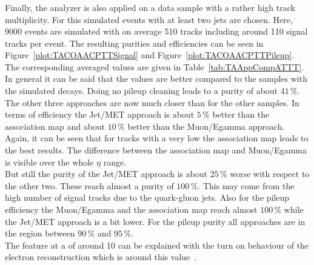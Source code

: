

\subsubsection{\ttbar \label{sec:TASEFRDACPTT}}
Finally, the analyzer is also applied on a data sample with a rather high track multiplicity. For this simulated \ttbar events with at least two jets are chosen. Here, 9000 events are simulated with on average 510 tracks including around 110 signal tracks per event. The resulting purities and efficiencies can be seen in Figure~\ref{plot:TACOAACPTTSignal} and Figure~\ref{plot:TACOAACPTTPileup}. The corresponding averaged values are given in Table~\ref{tab:TAAppCompATTT}. In general it can be said that the values are better compared to the samples with the simulated \Zz decays. Doing no pileup cleaning leads to a purity of about $41\,\%$. The other three approaches are now much closer than for the other samples. In terms of efficiency the Jet/MET approach is about $5\,\%$ better than the association map and about $10\,\%$ better than the Muon/Egamma approach. Again, it can be seen that for tracks with a very low \pt the association map leads to the best results. The difference between the association map and Muon/Egamma is visible over the whole $\eta$ range. \\
But still the purity of the Jet/MET approach is about $25\,\%$ worse with respect to the other two. These reach almost a purity of $100\,\%$. This may come from the high number of signal tracks due to the quark-gluon jets. Also for the pileup efficiency the Muon/Egamma and the association map reach almost $100\,\%$ while the Jet/MET approach is a bit lower. For the pileup purity all approaches are in the region between $90\,\%$ and $95\,\%$. \\
The feature at a \pt{} of around 10\GeV{} can be explained with the turn on behaviour of the electron reconstruction which is around this value~\cite{CMS-PAS-EGM-10-004}.

